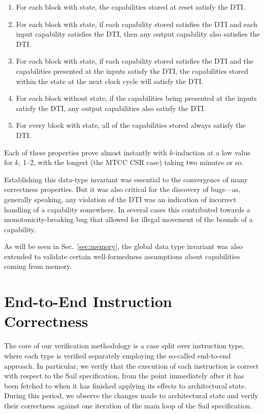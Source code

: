 \documentclass[10pt,conference]{IEEEtran}
\begin{document}
\begin{enumerate}
  \item For each block with state, the capabilities stored at reset satisfy
    the DTI. 
  \item For each block with state, if each capability stored 
    satisfies the DTI and each input capability satisfies the DTI,
    then any output capability also satisfies the DTI.
  \item For each block with state, if each capability stored satisfies the
    DTI and the capabilities presented at the inputs satisfy the DTI, the
    capabilities stored within the state at the next clock cycle will
    satisfy the DTI.
  \item For each block without state,  if the capabilities being
    presented at the inputs satisfy the DTI, any output capabilities also
    satisfy the DTI.
  \item For every block with state, all of the capabilities stored always satisfy the
    DTI.
\end{enumerate}

\noindent Each of these properties prove almost instantly with
$k$-induction at a low value for $k$, 1--2, with the longest (the MTCC CSR case)
taking two minutes or so.

Establishing this data-type invariant was essential to the convergence of
many correctness properties. But it was also critical for the discovery of
bugs---as, generally speaking, any violation of the DTI was an indication
of incorrect handling of a capability somewhere. In several cases this
contributed towards a monotonicity-breaking bug that allowed for illegal
movement of the bounds of a capability.

As will be seen in Sec.~\ref{sec:memory}, the global data type invariant
was also extended to validate certain well-formedness assumptions about
capabilities coming from memory.

\section{End-to-End Instruction Correctness}\label{sec:end-to-end}

The core of our verification methodology is a case split over instruction
type, where each type is verified separately employing the so-called
end-to-end approach. In particular, we verify that the execution of each instruction
is correct with respect to the Sail specification, from the point immediately
after it has been fetched to when it has finished applying its effects to
architectural state. During this period, we observe the changes made to
architectural state and verify their correctness against
one iteration of the main loop of the Sail specification.
\end{document}
